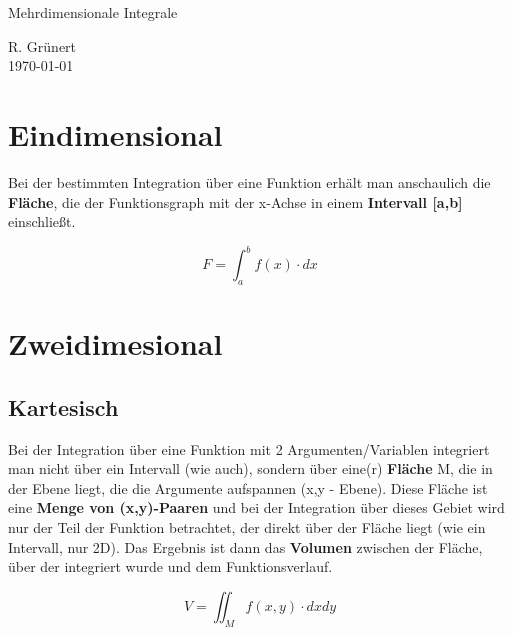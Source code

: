 \documentclass[11pt, a4paper]{article}
\newcommand{\colorEmph}[1]{\textbf{\color{blue-5}#1}}
\begin{document}
\begin{center}
  \Large{Mehrdimensionale Integrale}
\end{center}

\begin{flushright}
  R. Grünert\\
  \today
\end{flushright}

\section{Eindimensional}
Bei der bestimmten Integration über eine Funktion erhält man anschaulich die \colorEmph{Fläche}, die der Funktionsgraph mit der x-Achse in einem \colorEmph{Intervall [a,b]} einschließt.

\begin{figure}[H]
\centering
{}
\end{figure}

\[F = \int_{a}^{b}{f(x) \cdot dx}\]

\section{Zweidimesional}
\subsection{Kartesisch}
Bei der Integration über eine Funktion mit 2 Argumenten/Variablen integriert man nicht über ein Intervall (wie auch), sondern über eine(r) \colorEmph{Fläche} M, die in der Ebene liegt, die die Argumente aufspannen (x,y - Ebene). Diese Fläche ist eine \colorEmph{Menge von (x,y)-Paaren} und bei der Integration über dieses Gebiet wird nur der Teil der Funktion betrachtet, der direkt über der Fläche liegt (wie ein Intervall, nur 2D). Das Ergebnis ist dann das \colorEmph{Volumen} zwischen der Fläche, über der integriert wurde und dem Funktionsverlauf.

\begin{figure}[H]
\centering
{}
\end{figure}

\begin{figure}[H]
\centering
{}
\end{figure}

\[V = \iint_{M}{f(x,y)\cdot dx dy}\]
\end{document}
